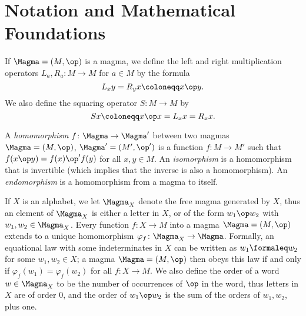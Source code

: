 \section{Notation and Mathematical Foundations}\label{notation-sec}

If $\Magma = (M,\op)$ is a magma, we define the left and right multiplication operators $L_a, R_a \colon M \to M$ for $a \in M$ by the formula
\begin{equation}\label{left-right}
    L_x y = R_y x \coloneqq x \op y.
\end{equation}
We also define the squaring operator $S \colon M \to M$ by
\begin{equation}\label{square-def}
    Sx \coloneqq x \op x = L_x x = R_x x.
\end{equation}

A \emph{homomorphism} $f \colon \Magma \to \Magma'$ between two magmas $\Magma = (M,\op)$, $\Magma' = (M',\op')$ is a function $f \colon M \to M'$ such that $f(x \op y) = f(x) \op' f(y)$ for all $x,y \in M$.  An \emph{isomorphism} is a homomorphism that is invertible (which implies that the inverse is also a homomorphism).  An \emph{endomorphism} is a homomorphism from a magma to itself.

If $X$ is an alphabet, we let $\Magma_X$ denote the free magma generated by $X$, thus an element of $\Magma_X$ is either a letter in $X$, or of the form $w_1 \op w_2$ with $w_1,w_2 \in \Magma_X$.  Every function $f \colon X \to M$ into a magma $\Magma = (M,\op)$ extends to a unique homomorphism $\varphi_f \colon \Magma_X \to \Magma$.  Formally, an equational law with some indeterminates in $X$ can be written as $w_1 \formaleq w_2$ for some $w_1, w_2 \in X$; a magma $\Magma = (M,\op)$ then obeys this law if and only if $\varphi_f(w_1) = \varphi_f(w_2)$ for all $f \colon X \to M$.  We also define the order of a word $w \in \Magma_X$ to be the number of occurrences of $\op$ in the word, thus letters in $X$ are of order $0$, and the order of $w_1 \op w_2$ is the sum of the orders of $w_1, w_2$, plus one.


